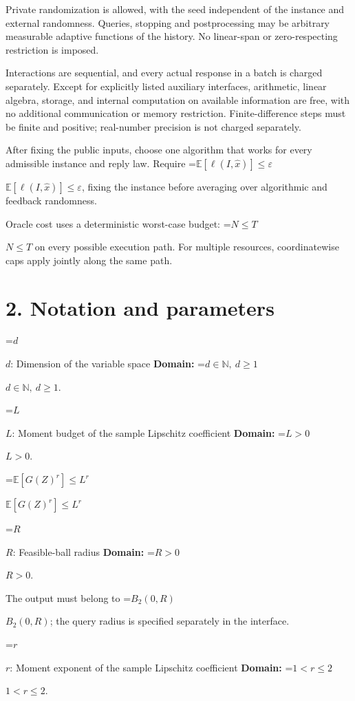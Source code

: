 \documentclass[10pt,a4paper]{article}
\newcommand{\AtlasMath}[1]{\par\begingroup\centering\setbox0=\hbox{$\displaystyle #1$}\ifdim\wd0>1.4\linewidth\typeout{ATLAS WIDE FORMULA: \the\wd0}\fi\ifdim\wd0>\linewidth\resizebox{\linewidth}{!}{\box0}\else\box0\fi\par\endgroup}
\newcommand{\AtlasInlineMath}[1]{\begingroup\setbox0=\hbox{$#1$}\ifdim\wd0>.4\linewidth\endgroup\AtlasMath{#1}\else\endgroup$#1$\fi}
\begin{document}
Private randomization is allowed, with the seed independent of the instance and external randomness. Queries, stopping and postprocessing may be arbitrary measurable adaptive functions of the history. No linear-span or zero-respecting restriction is imposed.



Interactions are sequential, and every actual response in a batch is charged separately. Except for explicitly listed auxiliary interfaces, arithmetic, linear algebra, storage, and internal computation on available information are free, with no additional communication or memory restriction. Finite-difference steps must be finite and positive; real-number precision is not charged separately.



After fixing the public inputs, choose one algorithm that works for every admissible instance and reply law. Require \AtlasInlineMath{\mathbb{E}[\ell(I,\widehat{x})]\le \varepsilon}, fixing the instance before averaging over algorithmic and feedback randomness.



Oracle cost uses a deterministic worst-case budget: \AtlasInlineMath{N\le T} on every possible execution path. For multiple resources, coordinatewise caps apply jointly along the same path.



\section{2. Notation and parameters}


\AtlasInlineMath{d}: Dimension of the variable space \textbf{Domain:} \AtlasInlineMath{d\in\mathbb{N},\ d\ge1}.



\AtlasInlineMath{L}: Moment budget of the sample Lipschitz coefficient \textbf{Domain:} \AtlasInlineMath{L>0}.



\AtlasInlineMath{\mathbb{E}[G(Z)^r]\le L^r}



\AtlasInlineMath{R}: Feasible-ball radius \textbf{Domain:} \AtlasInlineMath{R>0}.



The output must belong to \AtlasInlineMath{B_2(0,R)}; the query radius is specified separately in the interface.



\AtlasInlineMath{r}: Moment exponent of the sample Lipschitz coefficient \textbf{Domain:} \AtlasInlineMath{1<r\le2}.
\end{document}
